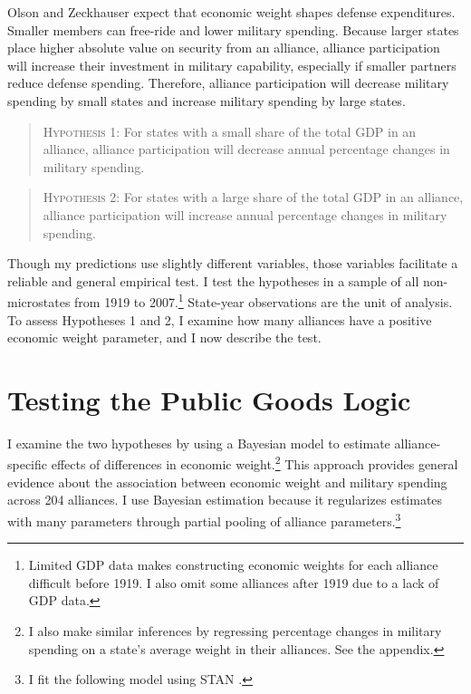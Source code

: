 \documentclass[12pt]{article}
\begin{document}
Olson and Zeckhauser expect that economic weight shapes defense expenditures. 
Smaller members can free-ride and lower military spending. 
Because larger states place higher absolute value on security from an alliance, alliance participation will increase their investment in military capability, especially if smaller partners reduce defense spending. 
Therefore, alliance participation will decrease military spending by small states and increase military spending by large states. 


\begin{quote}
\textsc{Hypothesis 1}: For states with a small share of the total GDP in an alliance, alliance participation will decrease annual percentage changes in military spending.
\end{quote}

\begin{quote}
\textsc{Hypothesis 2}: For states with a large share of the total GDP in an alliance, alliance participation will increase annual percentage changes in military spending. 
\end{quote}


Though my predictions use slightly different variables, those variables facilitate a reliable and general empirical test.
I test the hypotheses in a sample of all non-microstates from 1919 to 2007.\footnote{Limited GDP data makes constructing economic weights for each alliance difficult before 1919. I also omit some alliances after 1919 due to a lack of GDP data.}
State-year observations are the unit of analysis.
To assess Hypotheses 1 and 2, I examine how many alliances have a positive economic weight parameter, and I now describe the test.   
 


\section{Testing the Public Goods Logic}


I examine the two hypotheses by using a Bayesian model to estimate alliance-specific effects of differences in economic weight.\footnote{I also make similar inferences by regressing percentage changes in military spending on a state's average weight in their alliances. See the appendix.}
This approach provides general evidence about the association between economic weight and military spending across 204 alliances.
I use Bayesian estimation because it regularizes estimates with many parameters through partial pooling of alliance parameters.\footnote{I fit the following model using STAN \citep{Carpenteretal2016}.}
\end{document}
